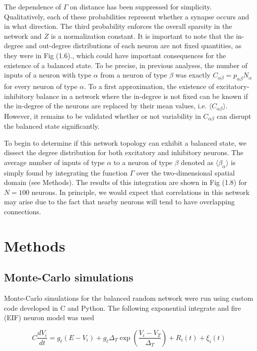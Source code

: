 \documentclass{ucetd}
\begin{document}
The dependence of $\Gamma$ on distance has been suppressed for simplicity. Qualitatively, each of these probabilities represent whether a synapse occurs and in what direction. The third probability enforces the overall sparsity in the network and $Z$ is a normalization constant. It is important to note that the in-degree and out-degree distributions of each neuron are not fixed quantities, as they were in Fig (1.6)., which could have important consequences for the existence of a balanced state. To be precise, in previous analyses, the number of inputs of a neuron with type $\alpha$ from a neuron of type $\beta$ was exactly $C_{\alpha\beta} = p_{\alpha\beta}N_{\alpha}$ for every neuron of type $\alpha$. To a first approximation, the existence of excitatory-inhibitory balance in a network where the in-degree is not fixed can be known if the in-degree of the neurons are replaced by their mean values, i.e. $\langle C_{\alpha\beta}\rangle$. However, it remains to be validated whether or not variability in $C_{\alpha\beta}$ can disrupt the balanced state significantly.

To begin to determine if this network topology can exhibit a balanced state, we dissect the degree distribution for both excitatory and inhibitory neurons. The average number of inputs of type $\alpha$ to a neuron of type $\beta$ denoted as $\langle \beta_{\alpha} \rangle$ is simply found by integrating the function $\Gamma$ over the two-dimensional spatial domain (see Methods). The results of this integration are shown in Fig (1.8) for $N=100$ neurons. In principle, we would expect that correlations in this network may arise due to the fact that nearby neurons will tend to have overlapping connections.


\clearpage
\section{Methods}

\subsection{Monte-Carlo simulations}

Monte-Carlo simulations for the balanced random network were run using custom code developed in C and Python. The following exponential integrate and fire (EIF) neuron model was used

\begin{equation}
C\frac{dV_{i}}{dt} = g_{\ell}(E - V_{i}) + g_{\ell}\Delta_{T}\exp\left(\frac{V_{i}-V_{T}}{\Delta_{T}}\right) + R_{i}(t) + \xi_{i}(t)
\end{equation}
\end{document}
